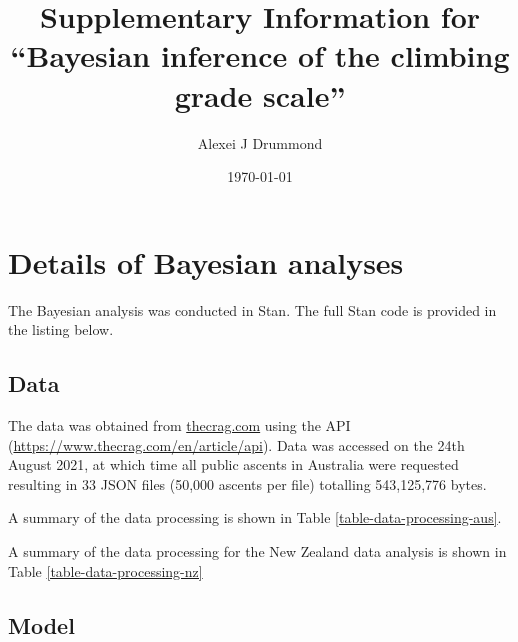 \documentclass[11pt]{article}
\begin{document}
\title{Supplementary Information for ``Bayesian inference of the climbing grade scale''}
\author{Alexei J Drummond}
\date{\today}
\maketitle

\section{Details of Bayesian analyses}

The Bayesian analysis was conducted in Stan. The full Stan code is provided in the listing below.

\subsection{Data}

The data was obtained from \url{thecrag.com} using the API (\url{https://www.thecrag.com/en/article/api}). Data was accessed on the 24th August 2021, at which time all public ascents in Australia were requested resulting in 33 JSON files (50,000 ascents per file) totalling 543,125,776 bytes.

A summary of the data processing is shown in Table \ref{table-data-processing-aus}.



A summary of the data processing for the New Zealand data analysis is shown in Table \ref{table-data-processing-nz}



\subsection{Model}
\end{document}
